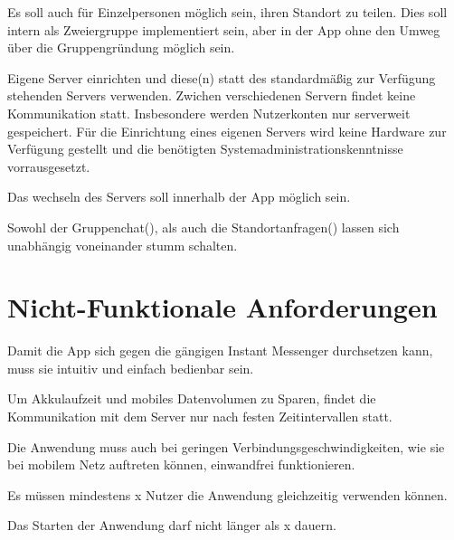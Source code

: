 \documentclass[parskip=full,11pt]{scrartcl}
\begin{document}
Es soll auch für Einzelpersonen möglich sein, ihren Standort zu teilen.
Dies soll intern als Zweiergruppe implementiert sein, aber in der App ohne den Umweg über die Gruppengründung möglich sein.

Eigene Server einrichten und diese(n) statt des standardmäßig zur Verfügung stehenden Servers verwenden.
Zwichen verschiedenen Servern findet keine Kommunikation statt.
Insbesondere werden Nutzerkonten nur serverweit gespeichert.
Für die Einrichtung eines eigenen Servers wird keine Hardware zur Verfügung gestellt
und die benötigten Systemadministrationskenntnisse vorrausgesetzt.

Das wechseln des Servers soll innerhalb der App möglich sein.

Sowohl der Gruppenchat(),
als auch die Standortanfragen() lassen sich unabhängig voneinander stumm schalten.


\section{Nicht-Funktionale Anforderungen}

Damit die App sich gegen die gängigen Instant Messenger durchsetzen kann, muss sie intuitiv und einfach bedienbar sein.

Um Akkulaufzeit und mobiles Datenvolumen zu Sparen, findet die Kommunikation mit dem Server nur nach festen Zeitintervallen statt.

Die Anwendung muss auch bei geringen Verbindungsgeschwindigkeiten, wie sie bei mobilem Netz auftreten können, einwandfrei funktionieren.

Es müssen mindestens x Nutzer die Anwendung gleichzeitig verwenden können.  %

Das Starten der Anwendung darf nicht länger als x dauern.   %
\end{document}

